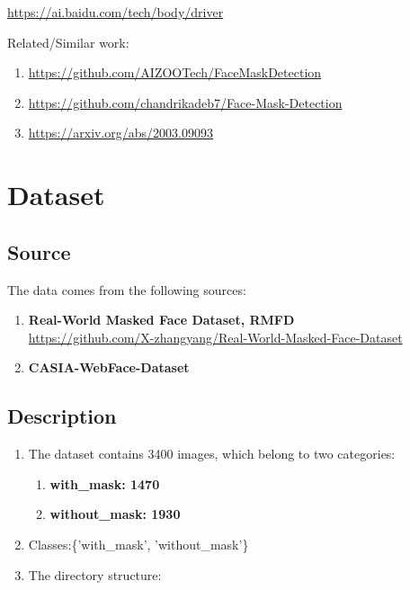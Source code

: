 \documentclass{article}
\begin{document}
\url{https://ai.baidu.com/tech/body/driver}


Related/Similar work:
\begin{enumerate}
  \item \url{https://github.com/AIZOOTech/FaceMaskDetection}
  \item \url{https://github.com/chandrikadeb7/Face-Mask-Detection}
  \item \url{https://arxiv.org/abs/2003.09093}
\end{enumerate}

\section{Dataset}

  \subsection{Source}
  The data comes from the following sources:
  \begin{enumerate}
    \item \textbf{Real-World Masked Face Dataset, RMFD}\\
          \url{https://github.com/X-zhangyang/Real-World-Masked-Face-Dataset}
    \item \textbf{CASIA-WebFace-Dataset}
  \end{enumerate}
  \subsection{Description}
  \begin{enumerate}
    \item The dataset contains 3400 images, which belong to two categories:
          \begin{enumerate}
            \item \textbf{with\_mask: 1470}
            \item \textbf{without\_mask: 1930}
          \end{enumerate}

    \item Classes:\{'with\_mask', 'without\_mask'\}
    
    \item The directory structure:
          \DTsetlength{0.2em}{1em}{0.2em}{1pt}{3pt}
  \end{enumerate}
\end{document}
